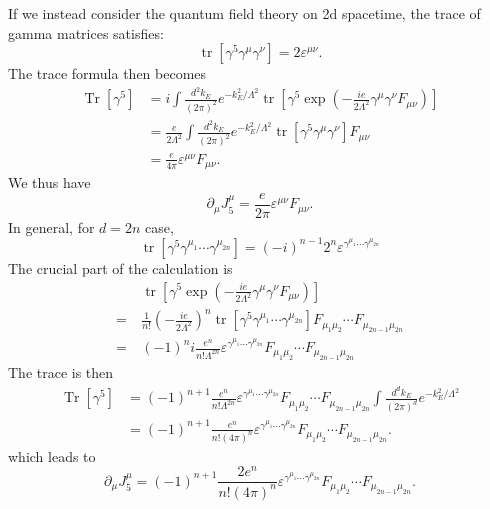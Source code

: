 \documentclass[aps,prb,superscriptaddress,nofootinbib]{revtex4}
\def \tr{\operatorname{tr}}
\def \Tr{\operatorname{Tr}}
\begin{document}
If we instead consider the quantum field theory on 2d spacetime, the trace of gamma matrices satisfies:
\begin{equation}
	\tr[\gamma^5 \gamma^\mu \gamma^\nu] = 2 \varepsilon^{\mu\nu}.
\end{equation}
The trace formula then becomes
\begin{equation}
\begin{aligned}
	\Tr[\gamma^5] 
	&= i\int \frac{d^2 k_E}{(2\pi)^2} e^{-k_E^2/\Lambda^2}\tr\left[\gamma^5 \exp\left(-\frac{ie}{2\Lambda^2} \gamma^\mu \gamma^\nu F_{\mu\nu}\right)\right] \\
	&= \frac{e}{2\Lambda^2} \int \frac{d^2 k_E}{(2\pi)^2} e^{-k_E^2/\Lambda^2}\tr\left[\gamma^5 \gamma^\mu \gamma^\nu \right]F_{\mu\nu} \\
	&= \frac{e}{4\pi}\varepsilon^{\mu\nu}F_{\mu\nu}.
\end{aligned}
\end{equation}
We thus have
\begin{equation}
	\partial_\mu J^\mu_5 = \frac{e}{2\pi} \varepsilon^{\mu\nu} F_{\mu\nu}.
\end{equation}
In general, for $d=2n$ case, 
\begin{equation}
	\tr[\gamma^5 \gamma^{\mu_1}\cdots \gamma^{\mu_{2n}}] = (-i)^{n-1} 2^n \varepsilon^{\gamma^{\mu_1}\cdots \gamma^{\mu_{2n}}}
\end{equation}
The crucial part of the calculation is
\begin{equation}
\begin{aligned}
	&\ \tr\left[\gamma^5 \exp\left(-\frac{ie}{2\Lambda^2} \gamma^\mu \gamma^\nu F_{\mu\nu}\right)\right] \\
	=&\ \frac{1}{n!}\left(-\frac{ie}{2\Lambda^2}\right)^n \tr[\gamma^5 \gamma^{\mu_1}\cdots \gamma^{\mu_{2n}}] F_{\mu_1\mu_2}\cdots F_{\mu_{2n-1}\mu_{2n}} \\
	=&\ (-1)^n i \frac{e^n}{n! \Lambda^{2n}} \varepsilon^{\gamma^{\mu_1}\cdots \gamma^{\mu_{2n}}} F_{\mu_1\mu_2}\cdots F_{\mu_{2n-1}\mu_{2n}}
\end{aligned}
\end{equation}
The trace is then
\begin{equation}
\begin{aligned}
	\Tr[\gamma^5] 
	&= (-1)^{n+1} \frac{e^n}{n! \Lambda^{2n}}\varepsilon^{\gamma^{\mu_1}\cdots \gamma^{\mu_{2n}}} F_{\mu_1\mu_2}\cdots F_{\mu_{2n-1}\mu_{2n}} \int \frac{d^d k_E}{(2\pi)^d} e^{-k_E^2/\Lambda^2} \\
	&= (-1)^{n+1} \frac{e^n}{n! (4\pi)^n} \varepsilon^{\gamma^{\mu_1}\cdots \gamma^{\mu_{2n}}} F_{\mu_1\mu_2}\cdots F_{\mu_{2n-1}\mu_{2n}}.
\end{aligned}
\end{equation}
which leads to
\begin{equation}
	\partial_\mu J^\mu_5 = (-1)^{n+1} \frac{2 e^n}{n! (4\pi)^n} \varepsilon^{\gamma^{\mu_1}\cdots \gamma^{\mu_{2n}}} F_{\mu_1\mu_2}\cdots F_{\mu_{2n-1}\mu_{2n}}.
\end{equation}
\end{document}
